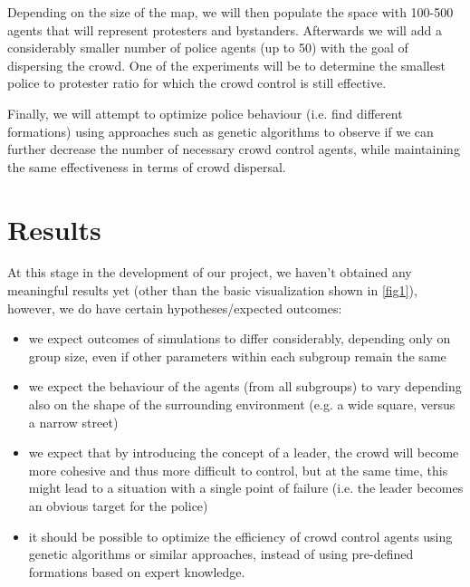 \documentclass[9pt]{pnas-new}
\begin{document}
\bigskip
Depending on the size of the map, we will then populate the space with 100-500 agents that will represent protesters and bystanders. Afterwards we will add a considerably smaller number of police agents (up to 50) with the goal of dispersing the crowd. One of the experiments will be to determine the smallest police to protester ratio for which the crowd control is still effective. 

\bigskip
Finally, we will attempt to optimize police behaviour (i.e. find different formations) using approaches such as genetic algorithms to observe if we can further decrease the number of necessary crowd control agents, while maintaining the same effectiveness in terms of crowd dispersal. 

\section*{Results}

At this stage in the development of our project, we haven't obtained any meaningful results yet (other than the basic visualization shown in \ref{fig1}), however, we do have certain hypotheses/expected outcomes:
\begin{itemize}
    \item we expect outcomes of simulations to differ considerably, depending only on group size, even if other parameters within each subgroup remain the same
    \item we expect the behaviour of the agents (from all subgroups) to vary depending also on the shape of the surrounding environment (e.g. a wide square, versus a narrow street)
    \item we expect that by introducing the concept of a leader, the crowd will become more cohesive and thus more difficult to control, but at the same time, this might lead to a situation with a single point of failure (i.e. the leader becomes an obvious target for the police)
    \item it should be possible to optimize the efficiency of crowd control agents using genetic algorithms or similar approaches, instead of using pre-defined formations based on expert knowledge. 
\end{itemize}
\end{document}
